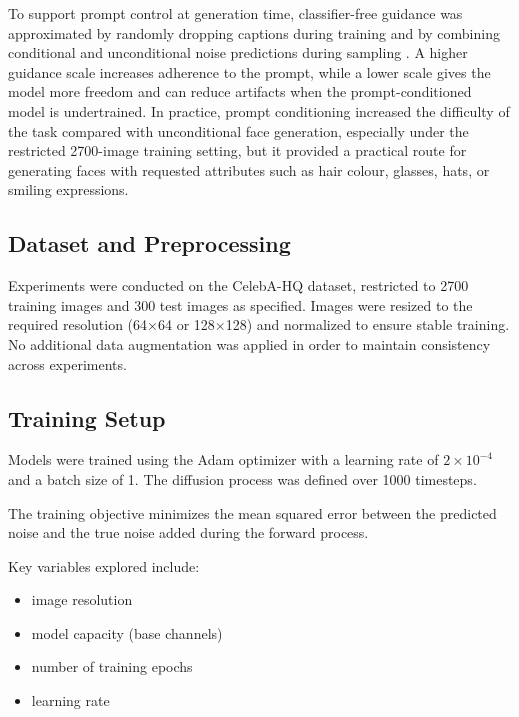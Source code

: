 \documentclass[conference]{IEEEtran}
\begin{document}
To support prompt control at generation time, classifier-free guidance was approximated by randomly dropping captions during training and by combining conditional and unconditional noise predictions during sampling \cite{b7}. A higher guidance scale increases adherence to the prompt, while a lower scale gives the model more freedom and can reduce artifacts when the prompt-conditioned model is undertrained. In practice, prompt conditioning increased the difficulty of the task compared with unconditional face generation, especially under the restricted 2700-image training setting, but it provided a practical route for generating faces with requested attributes such as hair colour, glasses, hats, or smiling expressions.

\subsection{Dataset and Preprocessing}

Experiments were conducted on the CelebA-HQ dataset, restricted to 2700 training images and 300 test images as specified. Images were resized to the required resolution (64$\times$64 or 128$\times$128) and normalized to ensure stable training. No additional data augmentation was applied in order to maintain consistency across experiments.

\subsection{Training Setup}

Models were trained using the Adam optimizer with a learning rate of $2\times10^{-4}$ and a batch size of 1. The diffusion process was defined over 1000 timesteps.

The training objective minimizes the mean squared error between the predicted noise and the true noise added during the forward process.

Key variables explored include:

\begin{itemize}

  \item image resolution

  \item model capacity (base channels)

  \item number of training epochs

  \item learning rate

\end{itemize}
\end{document}
